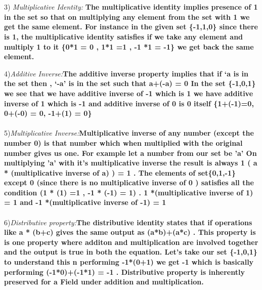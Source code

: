 \documentclass{article}
\begin{document}
\\
\\
3) \textit{Multiplicative Identity:\quad }\textbf{ The multiplicative identity implies presence of 1 in the set so that on multiplying any element from the set with 1 we get the same element. For instance in the given set \{-1,1,0\} since there is 1, the multiplicative identity satisfies if we take any element and multiply 1 to it \{0*1 = 0 , 1*1 =1 , -1 *1 = -1\} we get back the same element.  }


4)\textit{Additive Inverse:\quad}\textbf{The additive inverse property implies that if ‘a is in the set then , ‘-a’ is in the set such that a+(-a) = 0 In the set \{-1,0,1\} we see that we have additive inverse of -1 which is 1   we have additive inverse of 1 which is -1 and additive inverse of 0 is 0 itself \{1+(-1)=0, 0+(-0) = 0, -1+(1) = 0\}}
\\
\\
5)\textit{Multiplicative Inverse:\quad}\textbf{Multiplicative inverse of any number (except the number 0) is that number which when multiplied with the original number gives us one. For example let a number from our set be 'a' On multiplying 'a' with it's multiplicative inverse the result is always 1 ( a * (multiplicative inverse of a) ) = 1 . The elements of  set\{0,1,-1\} except 0 (since there is no multiplicative inverse of 0 ) satisfies all the condition 
(1 * (1) =1 , -1 * (-1) = 1) . 1 *(multiplicative inverse of 1) = 1
and -1 *(multiplicative inverse of -1) = 1}
\\
\\

6)\textit{Distributive property:\quad}\textbf{The distributive identity states that if operations like a * (b+c) gives the same output as (a*b)+(a*c) . This property is is one property where additon and multiplication are involved together and the output is true in both the equation. Let's take our set \{-1,0,1\} to understand this  
n performing -1*(0+1) we get -1 which is basically performing (-1*0)+(-1*1) = -1 . Distributive property is inherently preserved for a Field under addition and multiplication.}
\\
\\
\pagebreak 
\end{document}
